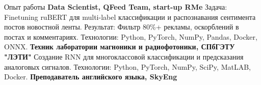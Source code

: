 \begin{rubric}{Опыт работы}
 \textbf{Data Scientist, QFeed Team, start-up RMe}
\newline \qquad
    Задача: Finetuning ruBERT для multi-label классификации и распознавания сентимента постов новостной ленты.
    \newline
    Результат: Фильтр 80\%+ рекламы, оскорблений в постах и комментариях.
\newline
    Технологии: Python, PyTorch, NumPy, Pandas, Docker, ONNX.
\entry*[2021 - 2023] \textbf{Техник лаборатории магноники и радиофотоники, СПбГЭТУ "ЛЭТИ"}
\newline \qquad
    Создание RNN для многоклассовой классификации и предсказания аналоговых сигналов.
\newline
    Технологии: Python, PyTorch, NumPy, SciPy, MatLAB, Docker.
 \textbf{Преподаватель английского языка, SkyEng}

\end{rubric}